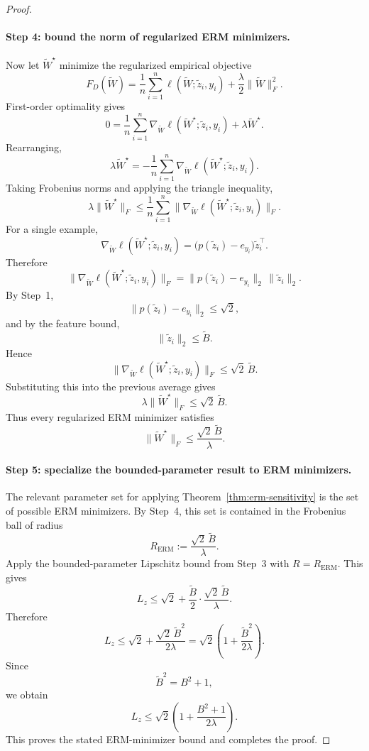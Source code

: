 \documentclass[11pt,a4paper]{report}
\theoremstyle{plain}
\theoremstyle{definition}
\theoremstyle{remark}
\begin{document}
\begin{proof}
\paragraph{Step 4: bound the norm of regularized ERM minimizers.}
Now let $\widetilde W^\star$ minimize the regularized empirical objective
\[
F_D(\widetilde W)
=
\frac{1}{n}\sum_{i=1}^n
\ell(\widetilde W;\widetilde z_i,y_i)
+
\frac{\lambda}{2}\|\widetilde W\|_F^2.
\]
First-order optimality gives
\[
0
=
\frac{1}{n}\sum_{i=1}^n
\nabla_{\widetilde W}\ell(\widetilde W^\star;\widetilde z_i,y_i)
+
\lambda\widetilde W^\star.
\]
Rearranging,
\[
\lambda\widetilde W^\star
=
-
\frac{1}{n}\sum_{i=1}^n
\nabla_{\widetilde W}\ell(\widetilde W^\star;\widetilde z_i,y_i).
\]
Taking Frobenius norms and applying the triangle inequality,
\[
\lambda\|\widetilde W^\star\|_F
\le
\frac{1}{n}\sum_{i=1}^n
\|\nabla_{\widetilde W}\ell(\widetilde W^\star;\widetilde z_i,y_i)\|_F.
\]
For a single example,
\[
\nabla_{\widetilde W}\ell(\widetilde W^\star;\widetilde z_i,y_i)
=
\bigl(p(\widetilde z_i)-e_{y_i}\bigr)\widetilde z_i^\top.
\]
Therefore
\[
\|\nabla_{\widetilde W}\ell(\widetilde W^\star;\widetilde z_i,y_i)\|_F
=
\|p(\widetilde z_i)-e_{y_i}\|_2\,\|\widetilde z_i\|_2.
\]
By Step~1,
\[
\|p(\widetilde z_i)-e_{y_i}\|_2\le \sqrt{2},
\]
and by the feature bound,
\[
\|\widetilde z_i\|_2\le \widetilde B.
\]
Hence
\[
\|\nabla_{\widetilde W}\ell(\widetilde W^\star;\widetilde z_i,y_i)\|_F
\le
\sqrt{2}\,\widetilde B.
\]
Substituting this into the previous average gives
\[
\lambda\|\widetilde W^\star\|_F
\le
\sqrt{2}\,\widetilde B.
\]
Thus every regularized ERM minimizer satisfies
\[
\|\widetilde W^\star\|_F
\le
\frac{\sqrt{2}\,\widetilde B}{\lambda}.
\]

\paragraph{Step 5: specialize the bounded-parameter result to ERM minimizers.}
The relevant parameter set for applying Theorem~\ref{thm:erm-sensitivity} is the set of possible ERM minimizers. By Step~4, this set is contained in the Frobenius ball of radius
\[
R_{\mathrm{ERM}}
:=
\frac{\sqrt{2}\,\widetilde B}{\lambda}.
\]
Apply the bounded-parameter Lipschitz bound from Step~3 with $R=R_{\mathrm{ERM}}$. This gives
\[
L_z
\le
\sqrt{2}
+
\frac{\widetilde B}{2}
\cdot
\frac{\sqrt{2}\,\widetilde B}{\lambda}.
\]
Therefore
\[
L_z
\le
\sqrt{2}
+
\frac{\sqrt{2}\,\widetilde B^2}{2\lambda}
=
\sqrt{2}\left(1+\frac{\widetilde B^2}{2\lambda}\right).
\]
Since
\[
\widetilde B^2=B^2+1,
\]
we obtain
\[
L_z
\le
\sqrt{2}\left(1+\frac{B^2+1}{2\lambda}\right).
\]
This proves the stated ERM-minimizer bound and completes the proof.
\end{proof}
\end{document}
